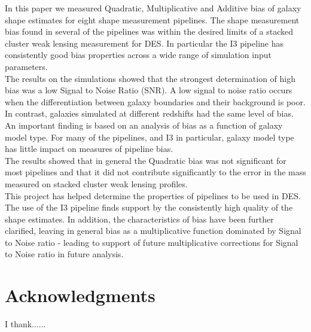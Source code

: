 \documentclass[useAMS,usenatbib]{mn2e}
\begin{document}
\indent In this paper we measured Quadratic, Multiplicative and
Additive bias of galaxy shape estimates for eight shape measurement
pipelines. The shape measurement bias found in several of the pipelines was within the
desired limits of a stacked cluster weak lensing measurement for
DES. In particular the I3 pipeline has consistently good bias properties
across a wide range of simulation input parameters.\\

\indent The results on the simulations showed that the strongest
determination of high bias was a low Signal to Noise Ratio (SNR). A
low signal to noise ratio occurs when the differentiation between
galaxy boundaries and their background is poor. In contrast, galaxies 
simulated at different redshifts had the same level of bias. An
important finding is based on an analysis of bias as a function of galaxy model
type. For many of the pipelines, and I3 in particular, galaxy
model type has little impact on measures of pipeline bias. \\

\indent The results showed that in general the Quadratic bias was not
significant for most pipelines and that it did not contribute
significantly to the error in the mass measured on stacked cluster
weak lensing profiles. \\

\indent This project has helped determine the properties of pipelines
to be used in DES. The use of the I3 pipeline
finds support by the consistently high quality of the shape
estimates. In addition, the characteristics of bias have been further
clarified, leaving in general bias as a multiplicative function
dominated by Signal to Noise ratio - leading to support of future
multiplicative corrections for Signal to Noise ratio in future
analysis. \\

 

 


\section*{Acknowledgments}
I thank......



\def\aj{AJ}                   %
\def\apj{ApJ}                 %
\def\apjl{ApJ}                %
\def\aap{A\&A}                %
\def\aaps{A\&AS}              %
\def\mnras{MNRAS}             %
\def\prd{Phys.~Rev.~D}       %
\let\astap=\aap
\let\apjlett=\apjl
\let\apjsupp=\apjs
\let\applopt=\ao
\end{document}
